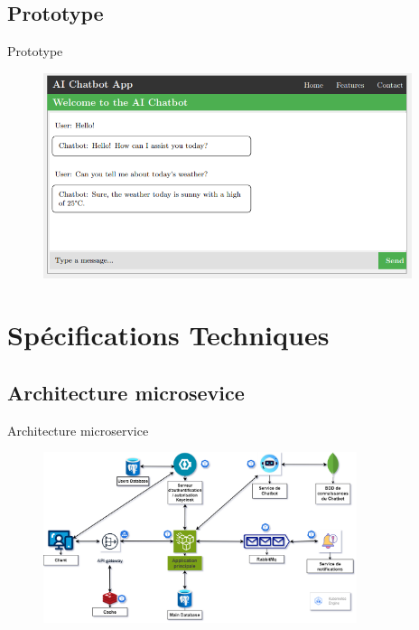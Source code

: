 \documentclass{beamer}
\begin{document}
\subsection{Prototype}
\begin{frame}{Prototype}

 \begin{figure}[htpb]
        \centering
        \includegraphics[height=6cm]{pic/prototype.png}
    \end{figure}
    
\end{frame}


\section{Spécifications Techniques}



\subsection{Architecture microsevice}



\begin{frame}{Architecture microservice}
   \begin{figure}[htpb]
        \centering
        \includegraphics[height=5cm]{pic/Code212_architecture.drawio (1).png}
    \end{figure}
\end{frame}
\end{document}
